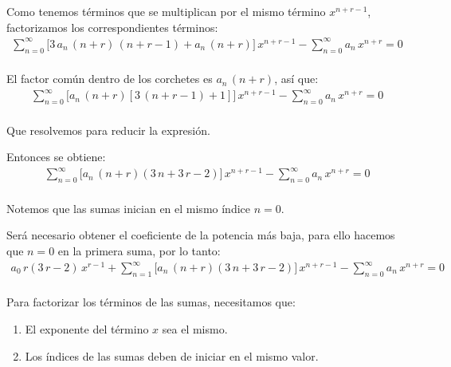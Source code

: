 Como tenemos términos que se multiplican por el mismo término $x^{n+r-1}$, factorizamos los correspondientes términos:
\begin{align*}
\sum_{n=0}^{\infty} \bigg[ 3 \, a_{n} \, (n + r) \, (n + r - 1) + a_{n} \, (n + r) \bigg] \, x^{n+r-1} - \sum_{n=0}^{\infty} a_{n} \, x^{n+r} = 0
\end{align*}
\\
El factor común dentro de los corchetes es $a_{n} \, (n + r)$, así que:
\begin{align*}
\sum_{n=0}^{\infty} \bigg[ a_{n} \, (n + r) [3 \, (n + r - 1) + 1 ] \bigg] \, x^{n+r-1} - \sum_{n=0}^{\infty} a_{n} \, x^{n+r} = 0
\end{align*}
\\
Que resolvemos para reducir la expresión.
\par
Entonces se obtiene:
\begin{align*}
\sum_{n=0}^{\infty} \bigg[ a_{n} \, (n + r) (3 \, n +  3 \, r - 2 ) \bigg] \, x^{n+r-1} - \sum_{n=0}^{\infty} a_{n} \, x^{n+r} = 0
\end{align*}
\\
Notemos que las sumas inician en el mismo índice $n = 0$.
\par
Será necesario obtener el coeficiente de la potencia más baja, para ello hacemos que $n = 0$ en la primera suma, por lo tanto:
\begin{align*}
a_{0} \, r (3 \, r {-}  2) \, x^{r-1} + \sum_{n=1}^{\infty} \bigg[ a_{n} \, (n {+} r) (3 \, n {+}  3 \, r {-} 2 ) \bigg] \, x^{n+r-1} - \sum_{n=0}^{\infty} a_{n} \, x^{n+r} = 0
\end{align*}
\\
Para factorizar los términos de las sumas, necesitamos que:
\begin{enumerate}
\item El exponente del término $x$ sea el mismo.
\item Los índices de las sumas deben de iniciar en el mismo valor.
\end{enumerate}

